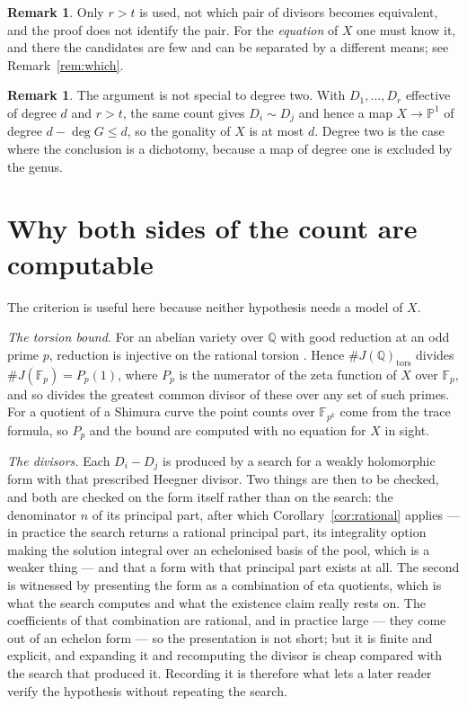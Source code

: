 \documentclass[11pt,reqno]{amsart}
\theoremstyle{plain}
\theoremstyle{definition}
\newtheorem{remark}[theorem]{Remark}
\newcommand{\Q}{\mathbb{Q}}
\newcommand{\PP}{\mathbb{P}}
\begin{document}
\begin{remark}
Only $r > t$ is used, not which pair of divisors becomes equivalent, and the proof does not
identify the pair. For the \emph{equation} of $X$ one must know it, and there the candidates are
few and can be separated by a different means; see Remark~\ref{rem:which}.
\end{remark}

\begin{remark}
The argument is not special to degree two. With $D_1, \dots, D_r$ effective of degree $d$ and
$r > t$, the same count gives $D_i \sim D_j$ and hence a map $X \to \PP^1$ of degree $d - \deg G
\le d$, so the gonality of $X$ is at most $d$. Degree two is the case where the conclusion is a
dichotomy, because a map of degree one is excluded by the genus.
\end{remark}

\section{Why both sides of the count are computable}\label{sec:effective}

The criterion is useful here because neither hypothesis needs a model of $X$.

\emph{The torsion bound.} For an abelian variety over $\Q$ with good reduction at an odd prime $p$,
reduction is injective on the rational torsion \cite[Appendix]{katz-torsion}. Hence
$\#J(\Q)_{\mathrm{tors}}$ divides $\#J(\mathbb{F}_p) = P_p(1)$, where $P_p$ is the numerator of the
zeta function of $X$ over $\mathbb{F}_p$, and so divides the greatest common divisor of these over
any set of such primes. For a quotient of a Shimura curve the point counts over $\mathbb{F}_{p^k}$
come from the trace formula, so $P_p$ and the bound are computed with no equation for $X$ in sight.

\emph{The divisors.} Each $D_i - D_j$ is produced by a search for a weakly holomorphic form with
that prescribed Heegner divisor. Two things are then to be checked, and both are checked on the
form itself rather than on the search: the denominator $n$ of its principal part, after which
Corollary~\ref{cor:rational} applies --- in practice the search returns a rational principal part,
its integrality option making the solution integral over an echelonised basis of the pool, which is
a weaker thing --- and that a form with that principal part exists at all. The second is
witnessed by presenting the form as a combination of eta quotients, which is what the search
computes and what the existence claim really rests on. The coefficients of that combination are
rational, and in practice large --- they come out of an echelon form --- so the presentation is not
short; but it is finite and explicit, and expanding it and recomputing the divisor is cheap
compared with the search that produced it. Recording it is therefore what lets a later reader
verify the hypothesis without repeating the search.
\end{document}
